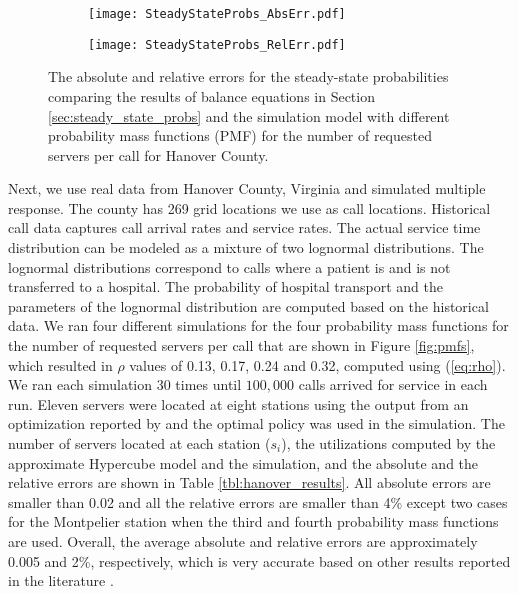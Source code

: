 \documentclass[11pt]{article}\topmargin 0mm
\begin{document}
\begin{figure}
        \centering
        \begin{subfigure}[b]{0.45\textwidth}
                \texttt{[image: SteadyStateProbs\_AbsErr.pdf]}
                \label{fig:steady_state_probs_abs_err}
        \end{subfigure}
        \begin{subfigure}[b]{0.45\textwidth}
                \texttt{[image: SteadyStateProbs\_RelErr.pdf]}
                \label{fig:steady_state_probs_rel_err}
        \end{subfigure}
        \caption{The absolute and relative errors for the steady-state probabilities comparing the results of balance equations in Section \ref{sec:steady_state_probs} and the simulation model with different probability mass functions (PMF) for the
number of requested servers per call for Hanover County.}\label{fig:steady_state_probs}
\end{figure}
Next, we use real data from Hanover County, Virginia and
simulated multiple response. The county has 269 grid locations
we use as call locations. Historical call data captures call
arrival rates and service rates. The actual service time
distribution can be modeled as a mixture of two lognormal
distributions. The lognormal distributions correspond to calls
where a patient is and is not transferred to a hospital. The
probability of hospital transport and the parameters of the
lognormal distribution are computed based on the historical
data. We ran four different simulations for the four
probability mass functions for the number of requested servers
per call that are shown in Figure \ref{fig:pmfs}, which
resulted in $\rho$ values of 0.13, 0.17, 0.24 and 0.32,
computed using (\ref{eq:rho}). We ran each simulation 30 times
until $100,000$ calls arrived for service in each run. Eleven
servers were located at eight stations using the output from an
optimization reported by \citet{Ansari2013} and the optimal
policy was used in the simulation. The number of servers
located at each station ($s_i$), the utilizations computed by
the approximate Hypercube model and the simulation, and the
absolute and the relative errors are shown in Table
\ref{tbl:hanover_results}. All absolute errors are smaller than
0.02 and all the relative errors are smaller than 4\% except
two cases for the Montpelier station when the third and fourth
probability mass functions are used. Overall, the average
absolute and relative errors are approximately 0.005 and 2\%,
respectively, which is very accurate based on other results
reported in the literature \citep{Budge-etal-09}.
\end{document}
